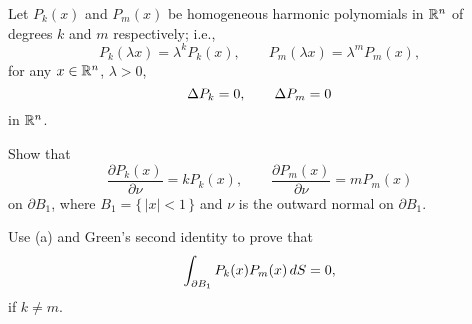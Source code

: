 \begin{problem}
  Let \(P_k(x)\) and \(P_m(x)\) be homogeneous harmonic polynomials in
  \(\mathbb{R}^n\) of degrees \(k\) and \(m\) respectively; i.e.,
  \[
    P_k(\lambda x)=\lambda^kP_k(x),\qquad P_m(\lambda x)=\lambda^mP_m(x),
  \]
  for any \(x\in\mathbb{R}^n\), \(\lambda>0\),
  \[
    \Delta P_k=0,\qquad\Delta P_m=0
  \]
  in \(\mathbb{R}^n\).
  \begin{alphlist}
  \item Show that
    \[
      \frac{\partial P_k(x)}{\partial\nu}=kP_k(x),\qquad
      \frac{\partial P_m(x)}{\partial \nu}=mP_m(x)
    \]
    on \(\partial B_1\), where \(B_1=\{\,|x|<1\,\}\) and \(\nu\) is the
    outward normal on \(\partial B_1\).
  \item Use (a) and Green's second identity to prove that
    \[
      \int_{\partial B_1} P_k(x)P_m(x)\mathop{}\!d S=0,
    \]
    if \(k\neq m\).
  \end{alphlist}
\end{problem}
\begin{solution*}
\end{solution*}

